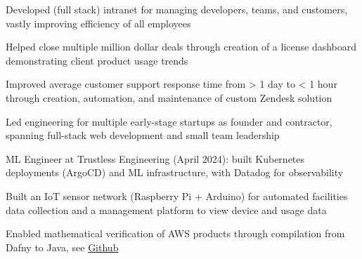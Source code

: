 \documentclass[]{jack-resume}
\begin{document}
\begin{tightemize}
    \item Developed (full stack) intranet for managing developers, teams, and customers, vastly improving efficiency of all employees
    \item Helped close multiple million dollar deals through creation of a license dashboard demonstrating client product usage trends
    \item Improved average customer support response time from > 1 day to < 1 hour through creation, automation, and maintenance of custom Zendesk solution
\end{tightemize}
\sectionsep

\begin{tightemize}
    \item Led engineering for multiple early-stage startups as founder and contractor, spanning full-stack web development and small team leadership
    \item ML Engineer at Trustless Engineering (April 2024): built Kubernetes deployments (ArgoCD) and ML infrastructure, with Datadog for observability
\end{tightemize}
\sectionsep

\begin{tightemize}
    \item Built an IoT sensor network (Raspberry Pi + Arduino) for automated facilities data collection and a management platform to view device and usage data
\end{tightemize}

\begin{tightemize}
    \item Enabled mathematical verification of AWS products through compilation from Dafny to Java, see \href{https://github.com/dafny-lang/dafny}{Github \ExternalLink}
\end{tightemize}
\sectionsep
\end{document}
